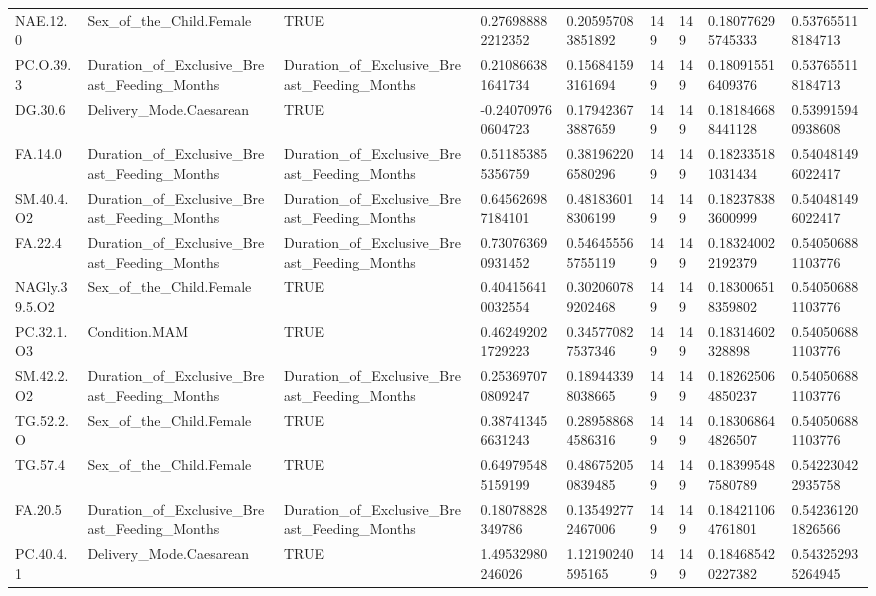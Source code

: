 \begin{longtable}{lllllllll}
NAE.12.0 & Sex\_of\_the\_Child.Female & TRUE & 0.276988882212352 & 0.205957083851892 & 149 & 149 & 0.180776295745333 & 0.537655118184713 \\
PC.O.39.3 & Duration\_of\_Exclusive\_Breast\_Feeding\_Months & Duration\_of\_Exclusive\_Breast\_Feeding\_Months & 0.210866381641734 & 0.156841593161694 & 149 & 149 & 0.180915516409376 & 0.537655118184713 \\
DG.30.6 & Delivery\_Mode.Caesarean & TRUE & -0.240709760604723 & 0.179423673887659 & 149 & 149 & 0.181846688441128 & 0.539915940938608 \\
FA.14.0 & Duration\_of\_Exclusive\_Breast\_Feeding\_Months & Duration\_of\_Exclusive\_Breast\_Feeding\_Months & 0.511853855356759 & 0.381962206580296 & 149 & 149 & 0.182335181031434 & 0.540481496022417 \\
SM.40.4.O2 & Duration\_of\_Exclusive\_Breast\_Feeding\_Months & Duration\_of\_Exclusive\_Breast\_Feeding\_Months & 0.645626987184101 & 0.481836018306199 & 149 & 149 & 0.182378383600999 & 0.540481496022417 \\
FA.22.4 & Duration\_of\_Exclusive\_Breast\_Feeding\_Months & Duration\_of\_Exclusive\_Breast\_Feeding\_Months & 0.730763690931452 & 0.546455565755119 & 149 & 149 & 0.183240022192379 & 0.540506881103776 \\
NAGly.39.5.O2 & Sex\_of\_the\_Child.Female & TRUE & 0.404156410032554 & 0.302060789202468 & 149 & 149 & 0.183006518359802 & 0.540506881103776 \\
PC.32.1.O3 & Condition.MAM & TRUE & 0.462492021729223 & 0.345770827537346 & 149 & 149 & 0.18314602328898 & 0.540506881103776 \\
SM.42.2.O2 & Duration\_of\_Exclusive\_Breast\_Feeding\_Months & Duration\_of\_Exclusive\_Breast\_Feeding\_Months & 0.253697070809247 & 0.189443398038665 & 149 & 149 & 0.182625064850237 & 0.540506881103776 \\
TG.52.2.O & Sex\_of\_the\_Child.Female & TRUE & 0.387413456631243 & 0.289588684586316 & 149 & 149 & 0.183068644826507 & 0.540506881103776 \\
TG.57.4 & Sex\_of\_the\_Child.Female & TRUE & 0.649795485159199 & 0.486752050839485 & 149 & 149 & 0.183995487580789 & 0.542230422935758 \\
FA.20.5 & Duration\_of\_Exclusive\_Breast\_Feeding\_Months & Duration\_of\_Exclusive\_Breast\_Feeding\_Months & 0.18078828349786 & 0.135492772467006 & 149 & 149 & 0.184211064761801 & 0.542361201826566 \\
PC.40.4.1 & Delivery\_Mode.Caesarean & TRUE & 1.49532980246026 & 1.12190240595165 & 149 & 149 & 0.184685420227382 & 0.543252935264945 \\

\end{longtable}
